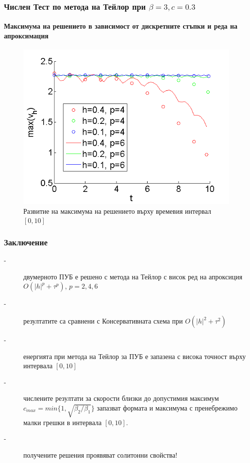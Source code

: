 \documentclass{beamer}
\begin{document}
\begin{frame}
\frametitle{Числен Тест по метода на Тейлор при $\beta = 3, c=0.3$}
\framesubtitle{Максимума на решението в зависимост от дискретните стъпки и реда на апроксимация}
\begin{figure}
	\includegraphics[width=0.8\linewidth]{../thesis/Maximum_TaylorZeroBnd_50x50_bt3_c030.png}
\caption{Развитие на максимума на решението върху времевия интервал $[0, 10]$}

\end{figure}

\end{frame}

\begin{frame}
\frametitle{Заключение}

\begin{description}
 \item[-] двумерното ПУБ е решено с метода на Тейлор с висок ред на апроксиция $O(|h|^p+\tau^p)$, $p=2,4,6$
 \item[-] резултатите са сравнени с Консервативната схема при $O(|h|^2+\tau^2)$
 \item[-] енергията при метода на Тейлор за ПУБ е запазена с висока точност върху интервала $[0, 10]$
 \item[-] числените резултати за скорости близки до допустимия максимум $c_{max} = min\{1, \sqrt{\beta_2/\beta_1} \}$ запазват формата и максимума с пренебрежимо малки грешки в интервала $[0, 10]$.
\item[-] получените решения проявяват солитонни свойства!
\end{description}

\end{frame}
\end{document}
